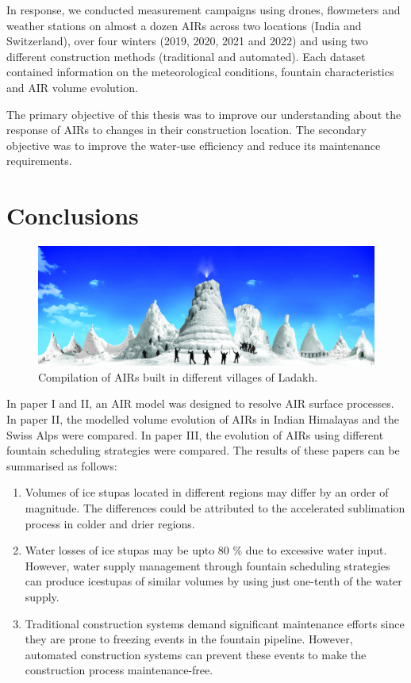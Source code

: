 In response, we conducted measurement campaigns using drones, flowmeters and weather stations on almost a dozen
AIRs across two locations (India and Switzerland), over four winters (2019, 2020, 2021 and 2022) and using two
different construction methods (traditional and automated). Each dataset contained information on the
meteorological conditions, fountain characteristics and AIR volume evolution. 

The primary objective of this thesis was to improve our understanding about the response of AIRs to changes in
their construction location. The secondary objective was to improve the water-use efficiency and reduce its
maintenance requirements.  

\section{Conclusions}

\begin{figure}[htb]
	\includegraphics[width=\textwidth]{figs/AIRs_Ladakh}
	\caption{Compilation of AIRs built in different villages of Ladakh.}
	\label{fig:airs_ladakh}
\end{figure}

In paper I and II, an AIR model was designed to resolve AIR surface processes. In paper II, the modelled volume
evolution of AIRs in Indian Himalayas and the Swiss Alps were compared. In paper III, the evolution of AIRs
using different fountain scheduling strategies were compared. The results of these papers can be summarised as
follows:

\begin{enumerate} 

\item Volumes of ice stupas located in different regions may differ by an order of magnitude. The differences
  could be attributed to the accelerated sublimation process in colder and drier regions.

\item Water losses of ice stupas may be upto 80 \% due to excessive water input. However, water supply
  management through fountain scheduling strategies can produce icestupas of similar volumes by using just
  one-tenth of the water supply.

\item Traditional construction systems demand significant maintenance efforts since they are prone to freezing
  events in the fountain pipeline. However, automated construction systems can prevent these events to make the
  construction process maintenance-free.

\end{enumerate}

